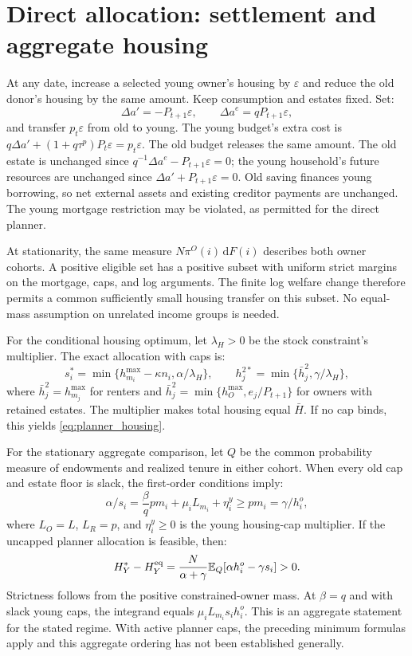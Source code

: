 \documentclass[11pt]{article}
\newcommand{\dd}{\mathrm d}
\begin{document}
\section{Direct allocation: settlement and aggregate housing}
\label{app:direct_settlement}

At any date, increase a selected young owner's housing by $\varepsilon$ and
reduce the old donor's housing by the same amount. Keep consumption and
estates fixed. Set:
\begin{equation}
\Delta a'=-P_{t+1}\varepsilon,\qquad
\Delta a^e=qP_{t+1}\varepsilon,
\end{equation}
and transfer $p_t\varepsilon$ from old to young. The young budget's extra
cost is $q\Delta a'+(1+q\tau^p)P_t\varepsilon=p_t\varepsilon$.
The old budget releases the same amount. The old estate is unchanged since
$q^{-1}\Delta a^e-P_{t+1}\varepsilon=0$; the young household's future
resources are unchanged since $\Delta a'+P_{t+1}\varepsilon=0$.
Old saving finances young borrowing, so net external assets and existing
creditor payments are unchanged. The young mortgage restriction may be
violated, as permitted for the direct planner.

At stationarity, the same measure $N\pi^O(i)\,\dd F(i)$ describes both
owner cohorts. A positive eligible set has a positive subset with uniform
strict margins on the mortgage, caps, and log arguments. The finite log
welfare change therefore permits a common sufficiently small housing
transfer on this subset. No equal-mass assumption on unrelated income
groups is needed.

For the conditional housing optimum, let $\lambda_H>0$ be the stock
constraint's multiplier. The exact allocation with caps is:
\begin{equation}
s_i^*=\min\{h_{m_i}^{\max}-\kappa n_i,\alpha/\lambda_H\},
\qquad h_j^{2*}=\min\{\bar h_j^2,\gamma/\lambda_H\},
\end{equation}
where $\bar h_j^2=h_{m_j}^{\max}$ for renters and
$\bar h_j^2=\min\{h_O^{\max},e_j/P_{t+1}\}$ for owners with retained
estates. The multiplier makes total housing equal $\bar H$.
If no cap binds, this yields \eqref{eq:planner_housing}.

For the stationary aggregate comparison, let $Q$ be the common probability
measure of endowments and realized tenure in either cohort. When every old
cap and estate floor is slack, the first-order conditions imply:
\begin{equation}
\alpha/s_i=\frac\beta q pm_i+\mu_iL_{m_i}+\eta_i^y
\ge pm_i=\gamma/h_i^o,
\end{equation}
where $L_O=L$, $L_R=p$, and $\eta_i^y\ge0$ is the young housing-cap
multiplier. If the uncapped planner allocation is feasible, then:
\begin{equation}
H_Y^*-H_Y^{\rm eq}=
\frac N{\alpha+\gamma}\mathbb E_Q[\alpha h_i^o-\gamma s_i]>0.
\end{equation}
Strictness follows from the positive constrained-owner mass. At $\beta=q$
and with slack young caps, the integrand equals $\mu_iL_{m_i}s_i h_i^o$.
This is an aggregate statement for the stated regime. With active planner
caps, the preceding minimum formulas apply and this aggregate ordering has
not been established generally.
\end{document}
